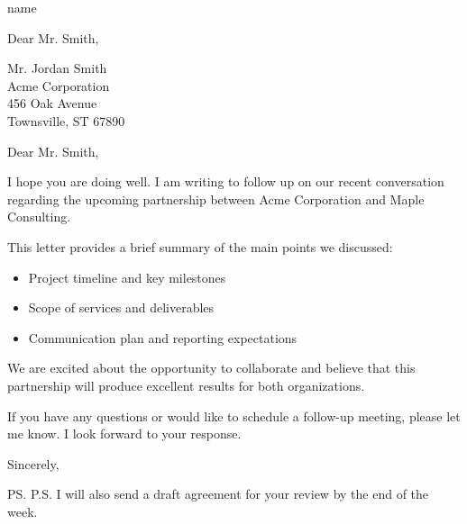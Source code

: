 \documentclass[11pt]{letter}
\date{April 7, 2026}
\begin{document}
\begin{letter}{name}

  \opening{Dear Mr. Smith,}

\end{letter}

\begin{letter}{
    Mr. Jordan Smith\\
    Acme Corporation\\
    456 Oak Avenue\\
  Townsville, ST 67890}

  \opening{Dear Mr. Smith,}

  I hope you are doing well. I am writing to follow up on our recent conversation regarding the upcoming partnership between Acme Corporation and Maple Consulting.

  This letter provides a brief summary of the main points we discussed:

  \begin{itemize}
    \item Project timeline and key milestones
    \item Scope of services and deliverables
    \item Communication plan and reporting expectations
  \end{itemize}

  We are excited about the opportunity to collaborate and believe that this partnership will produce excellent results for both organizations.

  If you have any questions or would like to schedule a follow-up meeting, please let me know. I look forward to your response.

  \closing{Sincerely,}

  \ps{P.S. I will also send a draft agreement for your review by the end of the week.}


\end{letter}
\end{document}

